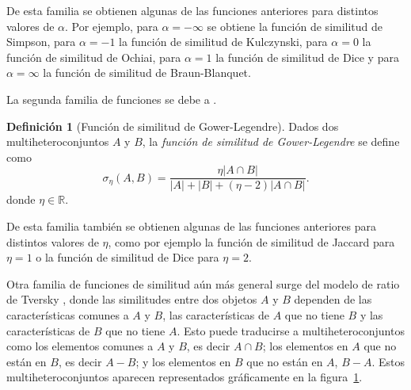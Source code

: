 \documentclass[a4paper,10pt,twoside]{article}
\theoremstyle{definition}
\newtheorem{definition}{Definición}
\begin{document}
De esta familia se obtienen algunas de las funciones anteriores para distintos valores de $\alpha$.
Por ejemplo, para $\alpha=-\infty$ se obtiene la función de similitud de Simpson, para $\alpha=-1$ la función de similitud de Kulczynski, para $\alpha=0$ la función de similitud de Ochiai, para $\alpha=1$ la función de similitud de Dice y para $\alpha=\infty$ la función de similitud de Braun-Blanquet.

La segunda familia de funciones se debe a \cite{gower1986metric}.

\begin{definition}[Función de similitud de Gower-Legendre]
Dados dos multiheteroconjuntos $A$ y $B$, la \emph{función de similitud de Gower-Legendre} se define como
\[
\sigma_\eta(A,B) = \frac{\eta|A\cap B|}{|A|+|B|+(\eta-2)|A\cap B|}.
\]
donde $\eta\in \mathbb{R}$.
\end{definition}

De esta familia también se obtienen algunas de las funciones anteriores para distintos valores de $\eta$, como por ejemplo la función de similitud de Jaccard para $\eta=1$ o la función de similitud de Dice para $\eta=2$. 

Otra familia de funciones de similitud aún más general surge del modelo de ratio de Tversky \cite{tversky1977features}, donde las similitudes entre dos objetos $A$ y $B$ dependen de las características comunes a $A$ y $B$, las características de $A$ que no tiene $B$ y las características de $B$ que no tiene $A$.
Esto puede traducirse a multiheteroconjuntos como los elementos comunes a $A$ y $B$, es decir $A\cap B$; los elementos en $A$ que no están en $B$, es decir $A-B$; y los elementos en $B$ que no están en $A$, $B-A$.
Estos multiheteroconjuntos aparecen representados gráficamente en la figura~\ref{fig:multiheteroconjuntos-tversky}.

\begin{figure}[htp]
\begin{center}
\label{fig:multiheteroconjuntos-tversky}
\end{center}
\end{figure}
\end{document}
